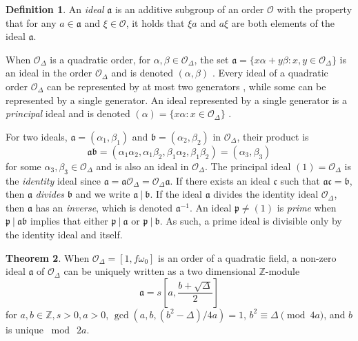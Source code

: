 \documentclass{ucalgthes1}
\theoremstyle{definition}
\newtheorem{thm}{Theorem}[section]
\newtheorem{defn}[thm]{Definition}
\newcommand{\OO}{\mathcal{O}}
\newcommand{\ZZ}{\mathbb{Z}}
\newcommand{\ideal}{\mathfrak}
\begin{document}
\begin{defn}
An \emph{ideal} $\mathfrak a$ is an additive subgroup of an order $\OO$ with the property that for any $a \in \mathfrak a$ and $\xi \in \OO$, it holds that $\xi a$ and $a \xi$ are both elements of the ideal $\mathfrak a$.
\end{defn}

When $\OO_\Delta$ is a quadratic order, for $\alpha, \beta \in \OO_\Delta$, the set $\ideal a = \{x \alpha + y \beta : x, y \in \OO_\Delta\}$ is an ideal in the order $\OO_\Delta$ and is denoted $(\alpha, \beta)$ \cite[p.16]{Ramachandran2006}.  Every ideal of a quadratic order $\OO_\Delta$ can be represented by at most two generators \cite[p.125--126,~\S~10]{Cohn1980}, while some can be represented by a single generator.  An ideal represented by a single generator is a \emph{principal} ideal and is denoted $(\alpha) = \{ x \alpha : x \in \OO_\Delta \}$ \cite[p.87]{Jacobson2009}.

For two ideals, $\ideal a = (\alpha_1, \beta_1)$ and $\ideal b = (\alpha_2, \beta_2)$ in $\OO_\Delta$, their product is
\begin{equation}
	\ideal a \ideal b = (\alpha_1 \alpha_2, \alpha_1 \beta_2, \beta_1 \alpha_2, \beta_1 \beta_2) = (\alpha_3, \beta_3) \label{eq:idealProduct}
\end{equation}
for some $\alpha_3, \beta_3 \in \OO_\Delta$ and is also an ideal in $\OO_\Delta$. The principal ideal $(1) = \OO_\Delta$ is the \emph{identity} ideal since $\ideal a = \ideal a \OO_\Delta = \OO_\Delta \ideal a$.  If there exists an ideal $\ideal c$ such that $\ideal a \ideal c = \ideal b$, then $\ideal a$ \emph{divides} $\ideal b$ and we write $\ideal a ~|~ \ideal b$.  If the ideal $\ideal a$ divides the identity ideal $\OO_\Delta$, then $\ideal a$ has an \emph{inverse}, which is denoted $\ideal a^{-1}$.  An ideal $\ideal p \neq (1)$ is \emph{prime} when $\ideal p ~|~ \ideal a \ideal b$ implies that either $\ideal p ~|~ \ideal a$ or $\ideal p ~|~ \ideal b$.  As such, a prime ideal is divisible only by the identity ideal and itself.

\begin{thm}
\label{thm:idealZModule}
\cite[p.13]{Jacobson1999} When $\OO_\Delta = [1, f\omega_0]$ is an order of a quadratic field, a \mbox{non-zero} ideal $\ideal a$ of $\OO_\Delta$ can be uniquely written as a two dimensional $\ZZ$-module 
\[
	\ideal a = s\left[a, \frac{b+\sqrt{\Delta}}{2} \right]
\]
for $a, b \in \ZZ, s > 0, a > 0$, $\gcd(a, b, (b^2-\Delta)/4a)=1$, $b^2 \equiv \Delta \pmod{4a}$, and $b$ is unique $\bmod ~2a$.
\end{thm}
\end{document}
